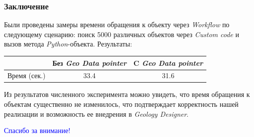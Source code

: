 \documentclass[pdf, 10pt, unicode, aspectratio=169]{beamer} %
\def\Blue#1{\textcolor{blue}{#1}}
\begin{document}
\begin{frame}\frametitle{Заключение}
Были проведены замеры времени обращения к объекту через \emph{Workflow} по следующему сценарию: поиск 5000 различных объектов через \emph{Custom code} и вызов метода \emph{Python}-объекта.
	Результаты:
	\begin{center}
		\begin{tabular}{|c|c|c|}
			\hline
			& Без \emph{Geo Data pointer} &  C \emph{Geo Data pointer}\\
			\hline
			Время (сек.) & 33.4 & 31.6 \\
			\hline
		\end{tabular}
	\end{center}
	
	Из результатов численного эксперимента можно увидеть, что время обращения к объектам существенно не изменилось, что подтверждает корректность нашей реализации и возможность ее внедрения в \emph{Geology Designer}.
\end{frame}
\begin{frame}
\begin{center}
\Huge{\Blue{Спасибо за внимание!}}
\end{center}
\end{frame}
\end{document}
